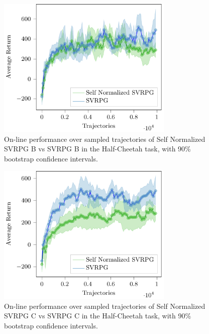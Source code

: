 \begin{figure}[h]
	\begin{minipage}[h]{1\textwidth}
		\centering
		\includegraphics[width=0.75\textwidth]{Images/Experiments/half_cheetah_SVRPG_vs_SN_SVRPG_B.pdf}
		\vspace{-0.1in}
		\caption{On-line performance over sampled trajectories of Self Normalized \acs{SVRPG} B vs \acs{SVRPG} B in the Half-Cheetah task, with 90\% bootstrap confidence intervals.}
		\label{fig:hcseven}
	\end{minipage}
	\vspace{-0.15in}
\end{figure}
\begin{figure}[h]
	\begin{minipage}[h]{1\textwidth}
		\centering
		\includegraphics[width=0.75\textwidth]{Images/Experiments/half_cheetah_SVRPG_vs_SN_SVRPG_C.pdf}
		\vspace{-0.1in}
		\caption{On-line performance over sampled trajectories of Self Normalized \acs{SVRPG} C vs \acs{SVRPG} C in the Half-Cheetah task, with 90\% bootstrap confidence intervals.}
		\label{fig:hcheight}
	\end{minipage}
	\vspace{-0.15in}
\end{figure}

